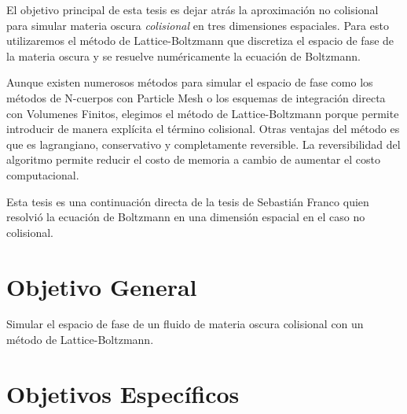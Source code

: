 \documentclass[12pt]{article}
\begin{document}
El objetivo principal de esta tesis es dejar atr\'as la aproximaci\'on
no colisional para simular materia oscura \emph{colisional} en tres
dimensiones espaciales.
Para esto utilizaremos el m\'etodo de Lattice-Boltzmann 
que  discretiza el espacio de fase de la materia oscura y se
resuelve numéricamente la ecuación de Boltzmann. 


Aunque existen numerosos métodos para simular el espacio de fase como
los métodos de N-cuerpos con Particle Mesh o los esquemas de
integración directa con Volumenes Finitos, elegimos el m\'etodo de
Lattice-Boltzmann porque permite introducir de manera expl\'icita el
t\'ermino colisional.
Otras ventajas del m\'etodo es que es lagrangiano,
conservativo y completamente reversible.\cite{integerLatticeDynamics}
La reversibilidad del algoritmo permite reducir el
costo de memoria a cambio de aumentar el costo computacional. 

Esta tesis es una continuaci\'on directa de la tesis de Sebasti\'an
Franco \cite{franco} quien resolvi\'o la ecuaci\'on de Boltzmann en
una dimensi\'on espacial en el caso no colisional.





\section{Objetivo General}


Simular el espacio de fase de un fluido de materia oscura colisional con un método de Lattice-Boltzmann.



\section{Objetivos Específicos}
\end{document}
